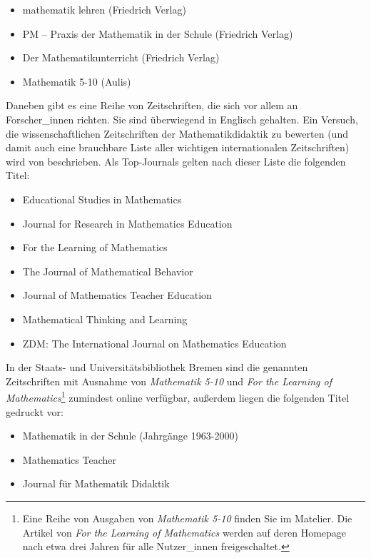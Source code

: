 \documentclass[ngerman,bibliography=totoc,oneside,12pt,a4paper]{scrbook}
\begin{document}
\begin{itemize}
\item
  mathematik lehren (Friedrich Verlag)
\item
  PM -- Praxis der Mathematik in der Schule (Friedrich Verlag)
\item
  Der Mathematikunterricht (Friedrich Verlag)
\item
  Mathematik 5-10 (Aulis)
\end{itemize}

Daneben gibt es eine Reihe von Zeitschriften, die sich vor allem an
Forscher\_innen richten. Sie sind überwiegend in Englisch gehalten. Ein
Versuch, die wissenschaftlichen Zeitschriften der Mathematikdidaktik zu
bewerten (und damit auch eine brauchbare Liste aller wichtigen
internationalen Zeitschriften) wird von \textcite{toerner2012}
beschrieben. Als Top-Journals gelten nach dieser Liste die folgenden
Titel:

\begin{itemize}
\item
  Educational Studies in Mathematics
\item
  Journal for Research in Mathematics Education
\item
  For the Learning of Mathematics
\item
  The Journal of Mathematical Behavior
\item
  Journal of Mathematics Teacher Education
\item
  Mathematical Thinking and Learning
\item
  ZDM: The International Journal on Mathematics Education
\end{itemize}

In der Staats- und Universitätsbibliothek Bremen sind die genannten
Zeitschriften mit Ausnahme von \emph{Mathematik 5-10} und \emph{For the
Learning of Mathematics}\footnote{Eine Reihe von Ausgaben von
  \emph{Mathematik 5-10} finden Sie im Matelier. Die Artikel von
  \emph{For the Learning of Mathematics} werden auf deren Homepage nach
  etwa drei Jahren für alle Nutzer\_innen freigeschaltet.} zumindest
online verfügbar, außerdem liegen die folgenden Titel gedruckt vor:

\begin{itemize}
\item
  Mathematik in der Schule (Jahrgänge 1963-2000)
\item
  Mathematics Teacher
\item
  Journal für Mathematik Didaktik
\end{itemize}
\end{document}
